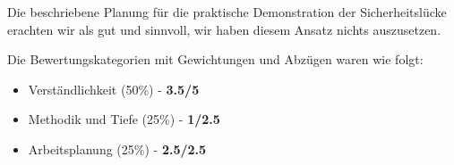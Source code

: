 \documentclass{article}
\begin{document}
 Die beschriebene Planung für die praktische Demonstration der Sicherheitslücke
 erachten wir als gut und sinnvoll, wir haben diesem Ansatz nichts auszusetzen.

 \pagebreak

 Die Bewertungskategorien mit Gewichtungen und Abzügen waren wie folgt:

 \begin{itemize}
   \item Verständlichkeit (50\%) - \textbf{3.5/5}
   \item Methodik und Tiefe (25\%) - \textbf{1/2.5}
   \item Arbeitsplanung (25\%) - \textbf{2.5/2.5}
 \end{itemize}
\end{document}
